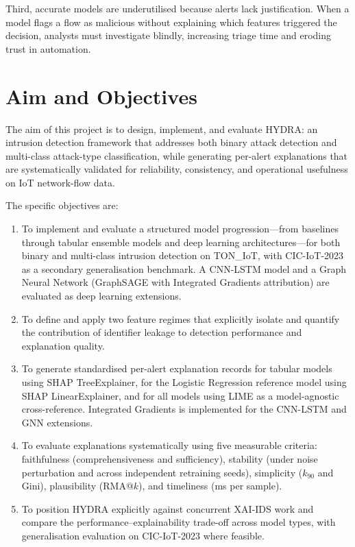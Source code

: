 \documentclass[12pt,a4paper]{report}
\begin{document}
Third, accurate models are underutilised because alerts lack justification. When a model flags a flow as malicious without explaining which features triggered the decision, analysts must investigate blindly, increasing triage time and eroding trust in automation.

\section{Aim and Objectives}
\label{sec:aim}

The aim of this project is to design, implement, and evaluate HYDRA: an intrusion detection framework that addresses both binary attack detection and multi-class attack-type classification, while generating per-alert explanations that are systematically validated for reliability, consistency, and operational usefulness on IoT network-flow data.

The specific objectives are:
\begin{enumerate}
  \item To implement and evaluate a structured model progression---from baselines through tabular ensemble models and deep learning architectures---for both binary and multi-class intrusion detection on TON\_IoT, with CIC-IoT-2023 as a secondary generalisation benchmark. A CNN-LSTM model and a Graph Neural Network (GraphSAGE with Integrated Gradients attribution) are evaluated as deep learning extensions.
  \item To define and apply two feature regimes that explicitly isolate and quantify the contribution of identifier leakage to detection performance and explanation quality.
  \item To generate standardised per-alert explanation records for tabular models using SHAP TreeExplainer, for the Logistic Regression reference model using SHAP LinearExplainer, and for all models using LIME as a model-agnostic cross-reference. Integrated Gradients is implemented for the CNN-LSTM and GNN extensions.
  \item To evaluate explanations systematically using five measurable criteria: faithfulness (comprehensiveness and sufficiency), stability (under noise perturbation and across independent retraining seeds), simplicity ($k_{90}$ and Gini), plausibility (RMA@$k$), and timeliness (ms per sample).
  \item To position HYDRA explicitly against concurrent XAI-IDS work and compare the performance--explainability trade-off across model types, with generalisation evaluation on CIC-IoT-2023 where feasible.
\end{enumerate}
\end{document}
